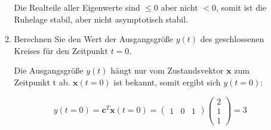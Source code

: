 \documentclass[crop=false]{standalone}
\begin{document}
\begin{task}
\begin{enumerate}[i]
\begin{enumerate}[A]
\begin{solution}
Die Realteile aller Eigenwerte sind $\leq 0$ aber nicht $<0$, somit ist die Ruhelage stabil, aber nicht asymptotisch stabil.
\end{solution}
\item Berechnen Sie den Wert der Ausgangsgröße $y(t)$ des geschlossenen Kreises
für den Zeitpunkt $t=0$.
\begin{solution}
Die Ausgangsgröße $y(t)$ hängt nur vom Zustandsvektor $\mathbf{x}$ zum Zeitpunkt t ab. $\mathbf{x}(t=0)$ ist bekannt, somit ergibt sich $y(t=0)$:

\[ y(t=0) = \mathbf{c}^T \mathbf{x}(t=0) = \begin{pmatrix}
1 & 0 & 1
\end{pmatrix} \begin{pmatrix}
2 \\ 1 \\ 1
\end{pmatrix} = 3\]
\end{solution}
\end{enumerate}
\end{enumerate}
\end{task}
\end{document}
